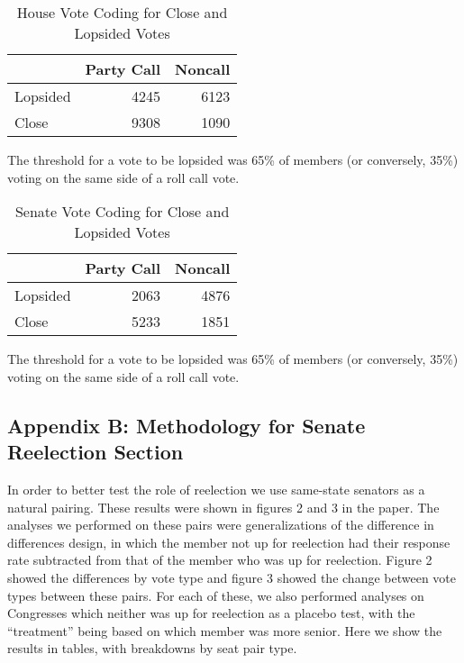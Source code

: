 \documentclass[12pt]{article}
\newcommand\fnote[1]{\captionsetup{font=small}\caption*{#1}}
\begin{document}
\begin{table}[H]
	\centering
	\singlespacing
	\caption{House Vote Coding for Close and Lopsided Votes} 
	\begin{tabular}{lrr}
		\hline
		& Party Call & Noncall \\ 
		\hline
		Lopsided & 4245 & 6123 \\ 
		Close & 9308 & 1090 \\ 
		\hline
	\end{tabular}
\fnote{The threshold for a vote to be lopsided was 65\% of members (or conversely, 35\%) voting on the same side of a roll call vote.}
\end{table}

\begin{table}[H]
	\centering
	\singlespacing
	\caption{Senate Vote Coding for Close and Lopsided Votes} 
	\begin{tabular}{lrr}
		\hline
		& Party Call & Noncall \\ 
		\hline
		Lopsided & 2063 & 4876 \\ 
		Close & 5233 & 1851 \\ 
		\hline
	\end{tabular}
\fnote{The threshold for a vote to be lopsided was 65\% of members (or conversely, 35\%) voting on the same side of a roll call vote.}
\end{table}













\subsection{Appendix B: Methodology for Senate Reelection Section}

In order to better test the role of reelection we use same-state senators as a natural pairing. These results were shown in figures 2 and 3 in the paper. The analyses we performed on these pairs were generalizations of the difference in differences design, in which the member not up for reelection had their response rate subtracted from that of the member who was up for reelection. Figure 2 showed the differences by vote type and figure 3 showed the change between vote types between these pairs. For each of these, we also performed analyses on Congresses which neither was up for reelection as a placebo test, with the ``treatment'' being based on which member was more senior. Here we show the results in tables, with breakdowns by seat pair type.
\end{document}
